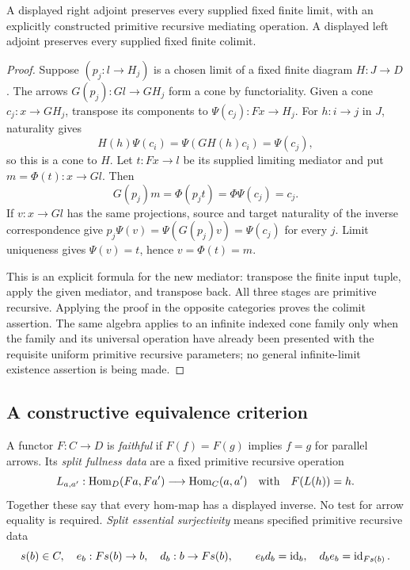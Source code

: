 \begin{theorem}\label{thm:adjoint-preserve}
A displayed right adjoint preserves every supplied fixed finite limit, with
an explicitly constructed primitive recursive mediating operation.  A
displayed left adjoint preserves every supplied fixed finite colimit.
\end{theorem}
\begin{proof}
Suppose $(p_j:l\to H_j)$ is a chosen limit of a fixed finite diagram
$H:J\to D$.  The arrows $G(p_j):Gl\to GH_j$ form a cone by functoriality.
Given a cone $c_j:x\to GH_j$, transpose its components to
$\Psi(c_j):Fx\to H_j$.  For $h:i\to j$ in $J$, naturality gives
\[
 H(h)\Psi(c_i)=\Psi(GH(h)c_i)=\Psi(c_j),
\]
so this is a cone to $H$.  Let $t:Fx\to l$ be its supplied limiting
mediator and put $m=\Phi(t):x\to Gl$.  Then
\[
 G(p_j)m=\Phi(p_jt)=\Phi\Psi(c_j)=c_j.
\]
If $v:x\to Gl$ has the same projections, source and target naturality of
the inverse correspondence give
$p_j\Psi(v)=\Psi(G(p_j)v)=\Psi(c_j)$ for every $j$.
Limit uniqueness gives $\Psi(v)=t$, hence $v=\Phi(t)=m$.

This is an explicit formula for the new mediator: transpose the finite
input tuple, apply the given mediator, and transpose back.  All three stages
are primitive recursive.  Applying the proof in the opposite categories
proves the colimit assertion.  The same algebra applies to an infinite
indexed cone family only when the family and its universal operation have
already been presented with the requisite uniform primitive recursive
parameters; no general infinite-limit existence assertion is being made.
\end{proof}

\subsection{A constructive equivalence criterion}

A functor $F:C\to D$ is \emph{faithful} if $F(f)=F(g)$ implies $f=g$ for
parallel arrows.  Its \emph{split fullness data} are a fixed primitive
recursive operation
\[
 L_{a,a'}:\operatorname{Hom}_D(Fa,Fa')\longrightarrow\operatorname{Hom}_C(a,a')
 \quad\hbox{with}\quad F(L(h))=h.
\]
Together these say that every hom-map has a displayed inverse.  No test for
arrow equality is required.  \emph{Split essential surjectivity} means
specified primitive recursive data
\[
 s(b)\in C,\quad e_b:Fs(b)\to b,\quad d_b:b\to Fs(b),
 \qquad e_bd_b=\operatorname{id}_b,\quad d_be_b=\operatorname{id}_{Fs(b)}.
\]


